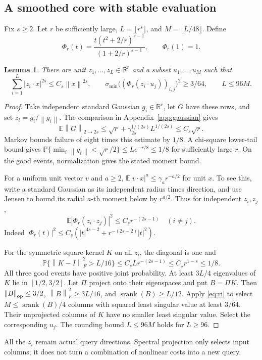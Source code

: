 \documentclass[11pt]{article}
\newtheorem{lemma}[theorem]{Lemma}
\theoremstyle{remark}\newtheorem{remark}[theorem]{Remark}
\newcommand{\R}{\mathbb R}\newcommand{\E}{\mathbb E}\newcommand{\Prob}{\mathbb P}
\newcommand{\norm}[1]{\left\|#1\right\|}\newcommand{\ip}[2]{\left\langle #1,#2\right\rangle}
\DeclareMathOperator{\srank}{srank}
\begin{document}
\subsection{A smoothed core with stable evaluation}
Fix $s\ge2$. Let $r$ be sufficiently large, $L=\lfloor r^s\rfloor$, and $M=\lfloor L/48\rfloor$. Define
\[
 \Phi_r(t)=\frac{t(t^2+2/r)^{s-1}}{(1+2/r)^{s-1}},\qquad \Phi_r(1)=1.
\]
\begin{lemma}\label{lem:core}
There are unit $z_1,\ldots,z_L\in\R^r$ and a subset $u_1,\ldots,u_M$ such that
\[
 \sum_{i=1}^L|z_i\cdot x|^{2s}\le C_s\norm x^{2s},\qquad
 \sigma_{\min}\bigl((\Phi_r(z_i\cdot u_j))_{i,j}\bigr)^2\ge3/64,
 \qquad L\le96M.
\]
\end{lemma}
\begin{proof}
Take independent standard Gaussian $g_i\in\R^r$, let $G$ have these rows, and set $z_i=g_i/\norm{g_i}$. The comparison in Appendix~\ref{app:gaussian} gives
\[
 \E\norm G_{2\to2s}\le\sqrt r+\gamma_{2s}^{1/(2s)}L^{1/(2s)}\le C_s\sqrt r.
\]
Markov bounds failure of eight times this estimate by $1/8$. A chi-square lower-tail bound gives $\Prob\{\min_i\norm{g_i}<\sqrt r/2\}\le Le^{-r/8}\le1/8$ for sufficiently large $r$. On the good events, normalization gives the stated moment bound.

For a uniform unit vector $v$ and $a\ge2$, $\E|v\cdot x|^a\le\gamma_a r^{-a/2}$ for unit $x$. To see this, write a standard Gaussian as its independent radius times direction, and use Jensen to bound its radial $a$-th moment below by $r^{a/2}$. Thus for independent $z_i,z_j$,
\[
 \E|\Phi_r(z_i\cdot z_j)|^2\le C_s r^{-(2s-1)}\quad(i\ne j).
\]
Indeed $|\Phi_r(t)|^2\le C_s(|t|^{4s-2}+r^{-(2s-2)}|t|^2)$.

For the symmetric square kernel $K$ on all $z_i$, the diagonal is one and
\[
 \Prob\{\norm{K-I}_F^2>L/16\}\le C_s L r^{-(2s-1)}\le C_s r^{1-s}\le1/8.
\]
All three good events have positive joint probability. At least $3L/4$ eigenvalues of $K$ lie in $[1/2,3/2]$. Let $\Pi$ project onto their eigenspaces and put $B=\Pi K$. Then $\norm B_{\op}\le3/2$, $\norm B_F^2\ge3L/16$, and $\srank(B)\ge L/12$. Apply \eqref{eq:ri} to select $M\le\srank(B)/4$ columns with squared least singular value at least $3/64$. Their unprojected columns of $K$ have no smaller least singular value. Select the corresponding $u_j$. The rounding bound $L\le96M$ holds for $L\ge96$.
\end{proof}
All the $z_i$ remain actual query directions. Spectral projection only selects input columns; it does not turn a combination of nonlinear costs into a new query.
\end{document}
